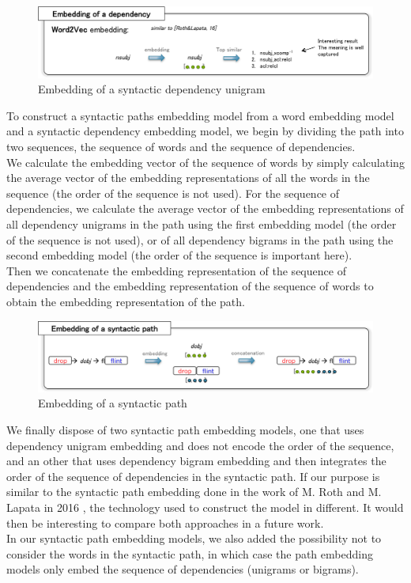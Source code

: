 \documentclass[twocolumn]{article}
\begin{document}
\begin{figure}[t]
   \centering \includegraphics[width=\linewidth]{Figures/Semantic_Parsing/dependencyEmbedding.png}
   \caption{\label{dependencyEmbedding} Embedding of a syntactic dependency unigram}
\end{figure}

To construct a syntactic paths embedding model from a word embedding model and a syntactic dependency embedding model, we begin by dividing the path into two sequences, the sequence of words and the sequence of dependencies.\\
We calculate the embedding vector of the sequence of words by simply calculating the average vector of the embedding representations of all the words in the sequence (the order of the sequence is not used). For the sequence of dependencies, we calculate the average vector of the embedding representations of all dependency unigrams in the path using the first embedding model (the order of the sequence is not used), or of all dependency bigrams in the path using the second embedding model (the order of the sequence is important here).\\
Then we concatenate the embedding representation of the sequence of dependencies and the embedding representation of the sequence of words to obtain the embedding representation of the path.

\begin{figure}[t]
   \centering \includegraphics[width=\linewidth]{Figures/Semantic_Parsing/pathEmbedding.png}
   \caption{\label{pathEmbedding} Embedding of a syntactic path}
\end{figure}

We finally dispose of two syntactic path embedding models, one that uses dependency unigram embedding and does not encode the order of the sequence, and an other that uses dependency bigram embedding and then integrates the order of the sequence of dependencies in the syntactic path. If our purpose is similar to the syntactic path embedding done in the work of M. Roth and M. Lapata in 2016 \cite{roth2016neural}, the technology used to construct the model in different. It would then be interesting to compare both approaches in a future work.\\
In our syntactic path embedding models, we also added the possibility not to consider the words in the syntactic path, in which case the path embedding models only embed the sequence of dependencies (unigrams or bigrams).
\end{document}
